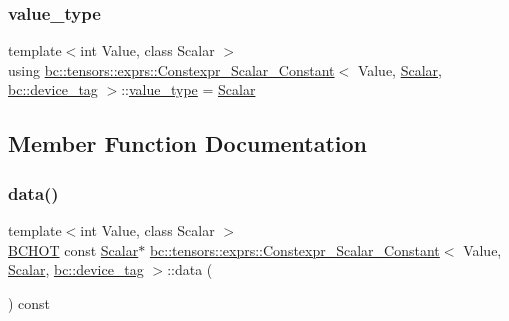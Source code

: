 \subsubsection{\texorpdfstring{value\+\_\+type}{value\_type}}
{\footnotesize\ttfamily template$<$int Value, class Scalar $>$ \\
using \hyperlink{structbc_1_1tensors_1_1exprs_1_1Constexpr__Scalar__Constant}{bc\+::tensors\+::exprs\+::\+Constexpr\+\_\+\+Scalar\+\_\+\+Constant}$<$ Value, \hyperlink{namespacebc_aa12ac55ee2c43dc082894dd3859daee1}{Scalar}, \hyperlink{structbc_1_1device__tag}{bc\+::device\+\_\+tag} $>$\+::\hyperlink{structbc_1_1Shape_3_010_01_4_a342cb50fc2de91d730a07750321bf986}{value\+\_\+type} =  \hyperlink{namespacebc_aa12ac55ee2c43dc082894dd3859daee1}{Scalar}}



\subsection{Member Function Documentation}
\mbox{\label{structbc_1_1tensors_1_1exprs_1_1Constexpr__Scalar__Constant_3_01Value_00_01Scalar_00_01bc_1_1device__tag_01_4_a6b1ff84b9b0a07da0a8ae86314c7c732}} 
\subsubsection{\texorpdfstring{data()}{data()}}
{\footnotesize\ttfamily template$<$int Value, class Scalar $>$ \\
\hyperlink{common_8h_ac085f07cc309e3aac24aa3fc0a40f6d2}{B\+C\+H\+OT} const \hyperlink{namespacebc_aa12ac55ee2c43dc082894dd3859daee1}{Scalar}$\ast$ \hyperlink{structbc_1_1tensors_1_1exprs_1_1Constexpr__Scalar__Constant}{bc\+::tensors\+::exprs\+::\+Constexpr\+\_\+\+Scalar\+\_\+\+Constant}$<$ Value, \hyperlink{namespacebc_aa12ac55ee2c43dc082894dd3859daee1}{Scalar}, \hyperlink{structbc_1_1device__tag}{bc\+::device\+\_\+tag} $>$\+::data (\begin{DoxyParamCaption}{ }\end{DoxyParamCaption}) const\hspace{0.3cm}{\ttfamily [inline]}}

